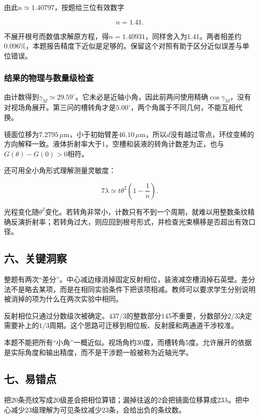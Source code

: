 \documentclass[12pt,a4paper,fontset=fandol]{ctexart}
\begin{document}
由此\(n\simeq1.40797\)，按题给三位有效数字

\[
\boxed{n=1.41}.
\]

不展开根号而数值求解原方程，得\(n=1.40931\)，同样舍入为1.41。两者相差约\(0.096\%\)，本题报告精度下近似是足够的。保留这个对照有助于区分近似误差与单位错误。

\subsubsection{结果的物理与数量级检查}\label{ux7ed3ux679cux7684ux7269ux7406ux4e0eux6570ux91cfux7ea7ux68c0ux67e5}

由计数得到\(\gamma_M\simeq29.59^\circ\)。它未必是近轴小角，因此前两问使用精确\(\cos\gamma_M\)，没有对视场角展开。第三问的槽转角才是\(5.00^\circ\)，两个角属于不同几何，不能互相代换。

镜面位移为\(7.2795\,\mu\mathrm m\)，小于初始臂差\(46.10\,\mu\mathrm m\)，所以\(d\)没有越过零点，环纹变稀的方向解释一致。液体折射率大于1，空槽和装液的转角计数差为正，也与\(G(\theta)-G(0)>0\)相符。

还可用全小角形式理解测量灵敏度：

\[
7\lambda\simeq t\theta^2\left(1-\frac1n\right).
\]

光程变化随\(\theta^2\)变化。若转角非常小，计数只有不到一个周期，就难以用整数条纹精确反演折射率；若转角过大，则应回到根号形式，并检查光束横移是否超出有效口径。

\subsection{六、关键洞察}\label{ux516dux5173ux952eux6d1eux5bdf}

整题有两次``差分''。中心减边缘消掉固定反射相位，装液减空槽消掉石英壁。差分法不是略去某项，而是在相同实验条件下把该项相减。教师可以要求学生分别说明被消掉的项为什么在两次实验中相同。

反射相位只通过分数级次被确定。\(437/3\)的整数部分145不重要，分数部分\(2/3\)决定需要补上的\(1/3\)周期。这个思路可迁移到相位板、反射膜和两通道干涉校准。

本题不能把所有``小角''一概近似。视场角约30度，而槽转角5度。允许展开的依据是实际角度和输出精度，而不是干涉题一般被称为近轴光学。

\subsection{七、易错点}\label{ux4e03ux6613ux9519ux70b9}

把20条亮纹写成20级差会把相位算错；漏掉往返的2会把镜面位移算成\(23\lambda\)。把中心减少23级理解为可见条纹减少23条，会给出负的条纹数。
\end{document}
